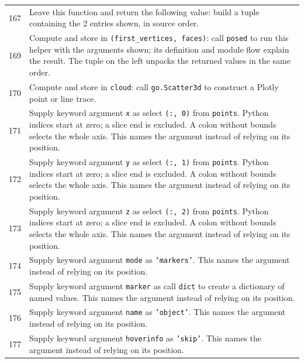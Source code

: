 \documentclass[11pt,a4paper]{book}
\begin{document}
\begin{longtable}{r p{}}
167 & Leave this function and return the following value: build a tuple containing the 2 entries shown, in source order. \\

169 & Compute and store in \texttt{(first\_vertices, faces)}: call \texttt{posed} to run this helper with the arguments shown; its definition and module flow explain the result. The tuple on the left unpacks the returned values in the same order. \\

170 & Compute and store in \texttt{cloud}: call \texttt{go.Scatter3d} to construct a Plotly point or line trace.  \\

171 & Supply keyword argument \texttt{x} as select \texttt{(:, 0)} from \texttt{points}. Python indices start at zero; a slice end is excluded. A colon without bounds selects the whole axis. This names the argument instead of relying on its position. \\

172 & Supply keyword argument \texttt{y} as select \texttt{(:, 1)} from \texttt{points}. Python indices start at zero; a slice end is excluded. A colon without bounds selects the whole axis. This names the argument instead of relying on its position. \\

173 & Supply keyword argument \texttt{z} as select \texttt{(:, 2)} from \texttt{points}. Python indices start at zero; a slice end is excluded. A colon without bounds selects the whole axis. This names the argument instead of relying on its position. \\

174 & Supply keyword argument \texttt{mode} as \texttt{'markers'}. This names the argument instead of relying on its position. \\

175 & Supply keyword argument \texttt{marker} as call \texttt{dict} to create a dictionary of named values. This names the argument instead of relying on its position. \\

176 & Supply keyword argument \texttt{name} as \texttt{'object'}. This names the argument instead of relying on its position. \\

177 & Supply keyword argument \texttt{hoverinfo} as \texttt{'skip'}. This names the argument instead of relying on its position. \\


\end{longtable}
\end{document}
